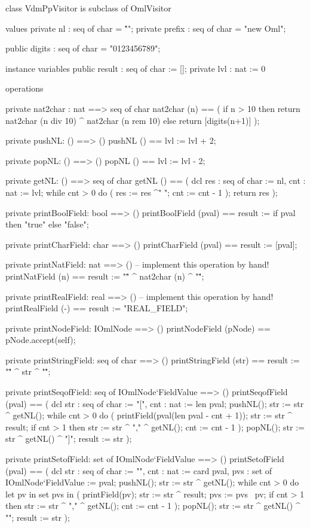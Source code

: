 \begin{vdm_al}
class VdmPpVisitor is subclass of OmlVisitor

values
  private nl : seq of char = "\r\n";
  private prefix : seq of char = "new Oml";
  
  public digits : seq of char = "0123456789";

instance variables
  public result : seq of char := [];
  private lvl : nat := 0

operations

  private nat2char : nat ==> seq of char
  nat2char (n) == 
  	( if n > 10 then
  		 return nat2char (n div 10) ^ nat2char (n rem 10)
  	  else
  	  	 return [digits(n+1)]
  	);


  private pushNL: () ==> ()
  pushNL () == lvl := lvl + 2;

  private popNL: () ==> ()
  popNL () == lvl := lvl - 2;

  private getNL: () ==> seq of char
  getNL () ==
    ( dcl res : seq of char := nl, cnt : nat := lvl;
      while cnt > 0 do ( res := res ^" "; cnt := cnt - 1 );
      return res );

  private printBoolField: bool ==> ()
  printBoolField (pval) ==
    result := if pval then "true" else "false";

  private printCharField: char ==> ()
  printCharField (pval) ==
    result := [pval];

  private printNatField: nat ==> ()
  -- implement this operation by hand!
  printNatField (n) == result := "\"" ^ nat2char (n) ^ "\""; 

  private printRealField: real ==> ()
  -- implement this operation by hand!
  printRealField (-) == result := "REAL_FIELD";  

  private printNodeField: IOmlNode ==> ()
  printNodeField (pNode) == pNode.accept(self);

  private printStringField: seq of char ==> ()
  printStringField (str) == result := "\"" ^ str ^ "\"";

  private printSeqofField: seq of IOmlNode`FieldValue ==> ()
  printSeqofField (pval) ==
    ( dcl str : seq of char := "[", cnt : nat := len pval;
      pushNL();
      str := str ^ getNL();
      while cnt > 0 do
        ( printField(pval(len pval - cnt + 1));
          str := str ^ result;
          if cnt > 1
          then str := str ^ "," ^ getNL();
          cnt := cnt - 1 ); 
      popNL();
      str := str ^ getNL() ^ "]";
      result := str );

  private printSetofField: set of IOmlNode`FieldValue ==> ()
  printSetofField (pval) ==
    ( dcl str : seq of char := "{", cnt : nat := card pval,
          pvs : set of IOmlNode`FieldValue := pval;
      pushNL();
      str := str ^ getNL();
      while cnt > 0 do
        let pv in set pvs in
          ( printField(pv);
            str := str ^ result;
            pvs := pvs \ {pv};
            if cnt > 1
            then str := str ^ "," ^ getNL();
            cnt := cnt - 1 ); 
      popNL();
      str := str ^ getNL() ^ "}";
      result := str );


\end{vdm_al}
